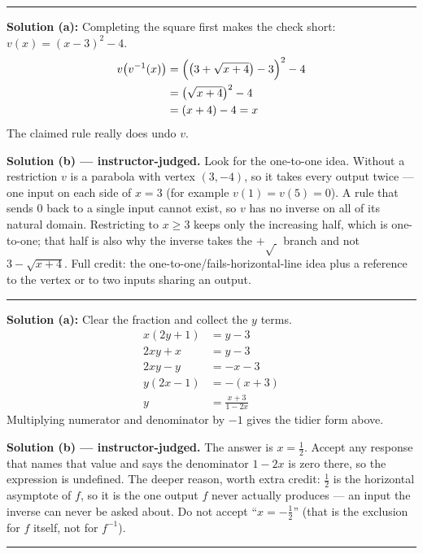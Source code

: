 \documentclass[12pt]{article}
\begin{document}
\vspace{0.2cm}\noindent\rule{\linewidth}{0.2pt}


\textbf{Solution (a):} Completing the square first makes the check short: $v(x) = (x - 3)^2 - 4$.
\begin{align*}
  v\bigl(v^{-1}(x)\bigr) &= \Bigl(\bigl(3 + \sqrt{x + 4}\bigr) - 3\Bigr)^2 - 4 \\
                         &= \bigl(\sqrt{x + 4}\bigr)^2 - 4 \\
                         &= (x + 4) - 4 = x
\end{align*}
The claimed rule really does undo $v$. 

\vspace{0.15cm}
\textbf{Solution (b) --- instructor-judged.} Look for the one-to-one idea. Without a
restriction $v$ is a parabola with vertex $(3, -4)$, so it takes every output twice --- one
input on each side of $x = 3$ (for example $v(1) = v(5) = 0$). A rule that sends $0$ back to
a single input cannot exist, so $v$ has no inverse on all of its natural domain. Restricting
to $x \ge 3$ keeps only the increasing half, which is one-to-one; that half is also why the
inverse takes the $+\sqrt{\ }$ branch and not $3 - \sqrt{x + 4}$. Full credit: the
one-to-one/fails-horizontal-line idea plus a reference to the vertex or to two inputs
sharing an output.

\vspace{0.2cm}\noindent\rule{\linewidth}{0.2pt}


\textbf{Solution (a):} Clear the fraction and collect the $y$ terms.
\begin{align*}
  x(2y + 1) &= y - 3 \\
  2xy + x &= y - 3 \\
  2xy - y &= -x - 3 \\
  y(2x - 1) &= -(x + 3) \\
  y &= \frac{x + 3}{1 - 2x}
\end{align*}
Multiplying numerator and denominator by $-1$ gives the tidier form above. 

\vspace{0.15cm}
\textbf{Solution (b) --- instructor-judged.} The answer is $x = \tfrac{1}{2}$. Accept any
response that names that value and says the denominator $1 - 2x$ is zero there, so the
expression is undefined. The deeper reason, worth extra credit: $\tfrac{1}{2}$ is the
horizontal asymptote of $f$, so it is the one output $f$ never actually produces --- an
input the inverse can never be asked about. Do not accept ``$x = -\tfrac{1}{2}$'' (that is
the exclusion for $f$ itself, not for $f^{-1}$).

\vspace{0.2cm}\noindent\rule{\linewidth}{0.2pt}
\end{document}
